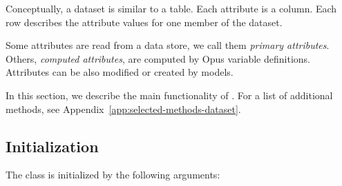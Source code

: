 Conceptually, a dataset \datasetindex is similar to a table.  Each attribute \attributesindex is a column.
Each row describes the attribute values for one member of the dataset. \datasetindex

Some attributes \attributesindex are read from a data store, we call them {\it primary
  attributes}. \primaryattributesindex  Others, {\it computed attributes}, \computedattributesindex are computed by Opus
variable definitions.  Attributes \attributesindex can be also modified or created by models.

In this section, we describe the main functionality of . For a list of additional methods, 
see Appendix~\ref{app:selected-methods-dataset}.

%
\subsection{Initialization}
%
The  \datasetindex class is initialized by the following arguments:
